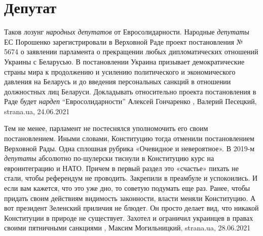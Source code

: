 
 
 
 
 
\chapter{Депутат}

Таков лозунг \emph{народных депутатов} от Евросолидарности.  Народные
\emph{депутаты} ЕС Порошенко зарегистрировали в Верховной Раде проект
постановления № 5674 о заявлении парламента о прекращении любых дипломатических
отношений Украины с Беларусью. В постановлении Украина призывает
демократические страны мира к продолжению и усилению политического и
экономического давления на Беларусь и до введения персональных санкций в
отношении должностных лиц Беларуси. Докладывать относительно проекта
постановления в Раде будет \emph{нардеп} \enquote{Евросолидарности} Алексей
Гончаренко
, 
Валерий Песецкий, strana.ua, 24.06.2021

Тем не менее, парламент не постеснялся уполномочить его своим постановлением.
Иными словами, Конституцию тогда отменили постановлением Верховной Рады. Одна
сплошная рубрика «Очевидное и невероятное».  В 2019-м \emph{депутаты} абсолютно
по-шулерски тиснули в Конституцию курс на евроинтеграцию и НАТО. Причем в
первый раздел это «счастье» пихать не стали, чтобы референдум не проводить.
Закрепили в преамбуле и успокоились.  И если вам кажется, что это уже дно, то
советую подумать еще раз. Ранее, чтобы придать своим действиям видимость
законности, власти меняли Конституцию. А вот президент Зеленский приличия не
блюдет. Он просто делает вид, что никакой Конституции в природе не существует.
Захотел и ограничил украинцев в правах своими пятничными санкциями
, 
Максим Могильницкий, strana.ua, 28.06.2021

